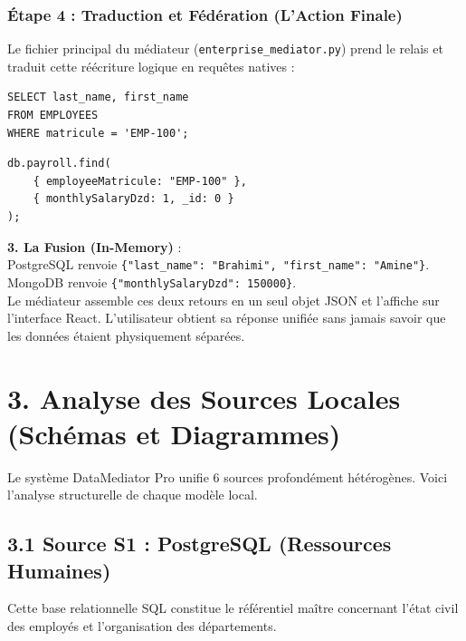 \documentclass[11pt,a4paper]{article}
\begin{document}
\subsubsection{Étape 4 : Traduction et Fédération (L'Action Finale)}
Le fichier principal du médiateur (\texttt{enterprise\_mediator.py}) prend le relais et traduit cette réécriture logique en requêtes natives :

\begin{tcolorbox}[colback=black!5, colframe=primary, title=1. Envoi à PostgreSQL (S1)]
\begin{verbatim}
SELECT last_name, first_name 
FROM EMPLOYEES 
WHERE matricule = 'EMP-100';
\end{verbatim}
\end{tcolorbox}

\begin{tcolorbox}[colback=black!5, colframe=primary, title=2. Envoi à MongoDB (S3)]
\begin{verbatim}
db.payroll.find(
    { employeeMatricule: "EMP-100" },
    { monthlySalaryDzd: 1, _id: 0 }
);
\end{verbatim}
\end{tcolorbox}

\textbf{3. La Fusion (In-Memory)} : \\
PostgreSQL renvoie \texttt{\{"last\_name": "Brahimi", "first\_name": "Amine"\}}. \\
MongoDB renvoie \texttt{\{"monthlySalaryDzd": 150000\}}. \\
Le médiateur assemble ces deux retours en un seul objet JSON et l'affiche sur l'interface React. L'utilisateur obtient sa réponse unifiée sans jamais savoir que les données étaient physiquement séparées.

\newpage

\section{3. Analyse des Sources Locales (Schémas et Diagrammes)}
Le système DataMediator Pro unifie 6 sources profondément hétérogènes. Voici l'analyse structurelle de chaque modèle local.

\subsection{3.1 Source S1 : PostgreSQL (Ressources Humaines)}
Cette base relationnelle SQL constitue le référentiel maître concernant l'état civil des employés et l'organisation des départements.
\end{document}
